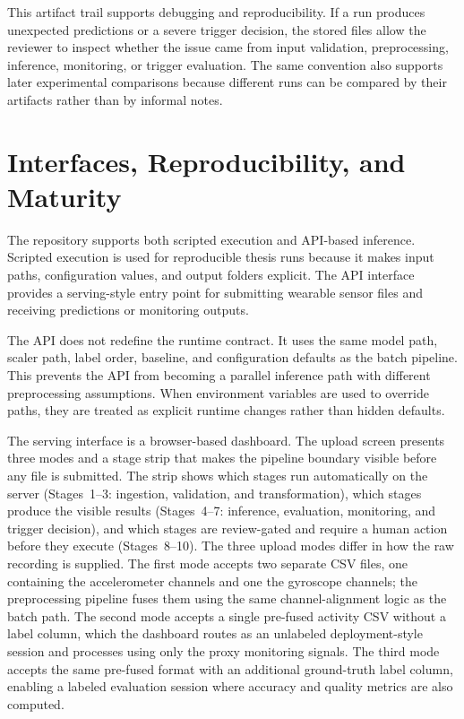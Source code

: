 This artifact trail supports debugging and reproducibility. If a run produces unexpected predictions or a severe trigger decision, the stored files allow the reviewer to inspect whether the issue came from input validation, preprocessing, inference, monitoring, or trigger evaluation. The same convention also supports later experimental comparisons because different runs can be compared by their artifacts rather than by informal notes.

\section{Interfaces, Reproducibility, and Maturity}
\label{sec:api_execution_interfaces}

The repository supports both scripted execution and API-based inference. Scripted execution is used for reproducible thesis runs because it makes input paths, configuration values, and output folders explicit. The API interface provides a serving-style entry point for submitting wearable sensor files and receiving predictions or monitoring outputs.

The API does not redefine the runtime contract. It uses the same model path, scaler path, label order, baseline, and configuration defaults as the batch pipeline. This prevents the API from becoming a parallel inference path with different preprocessing assumptions. When environment variables are used to override paths, they are treated as explicit runtime changes rather than hidden defaults.

The serving interface is a browser-based dashboard. The upload screen presents three modes
and a stage strip that makes the pipeline boundary visible before any file is submitted.
The strip shows which stages run automatically on the server (Stages~1--3: ingestion,
validation, and transformation), which stages produce the visible results (Stages~4--7:
inference, evaluation, monitoring, and trigger decision), and which stages are review-gated
and require a human action before they execute (Stages~8--10). The three upload modes
differ in how the raw recording is supplied. The first mode accepts two separate CSV files,
one containing the accelerometer channels and one the gyroscope channels; the preprocessing
pipeline fuses them using the same channel-alignment logic as the batch path. The second
mode accepts a single pre-fused activity CSV without a label column, which the dashboard
routes as an unlabeled deployment-style session and processes using only the proxy monitoring
signals. The third mode accepts the same pre-fused format with an additional ground-truth
label column, enabling a labeled evaluation session where accuracy and quality metrics are
also computed.

